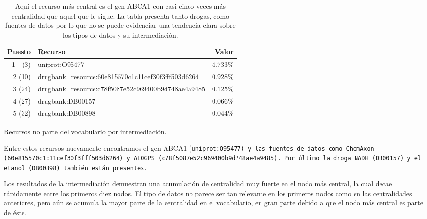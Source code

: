 \begin{table}[h]
  \centering
  \begin{tabular}{|r|l|r|}\hline
    \bf{Puesto} & \bf{Recurso} & \bf{Valor} \\\hline
    1~~(3) & uniprot:O95477                                      & $4.733\%$ \\\hline
    2 (10) & drugbank\_resource:60e815570c1c11cef30f3fff503d6264 & $0.928\%$ \\\hline
    3 (24) & drugbank\_resource:c78f5087e52c969400b9d748ae4a9485 & $0.125\%$ \\\hline
    4 (27) & drugbank:DB00157                                    & $0.066\%$ \\\hline
    5 (32) & drugbank:DB00898                                    & $0.044\%$ \\\hline
  \end{tabular}
  \caption{Recursos no parte del vocabulario por intermediación.}
  \label{tab:bet5}
  \vspace{-.2cm}
  \caption*{\small
    Aquí el recurso más central es el gen ABCA1 con casi cinco veces más
    centralidad que aquel que le sigue. La tabla presenta tanto drogas, como
    fuentes de datos por lo que no se puede evidenciar una tendencia clara sobre
    los tipos de datos y su intermediación.
  }
\end{table}

Entre estos recursos nuevamente encontramos el gen ABCA1 (\tt{uniprot:O95477})
y las fuentes de datos como ChemAxon (\tt{60e815570c1c11cef30f3fff503d6264}) y
ALOGPS (\tt{c78f5087e52c969400b9d748ae4a9485}). Por último la droga NADH
(\tt{DB00157}) y el etanol (\tt{DB00898}) también están presentes.

Los resultados de la intermediación demuestran una acumulación de centralidad
muy fuerte en el nodo más central, la cual decae rápidamente entre los primeros
diez nodos.
El tipo de datos no parece ser tan relevante en los primeros nodos como en las
centralidades anteriores, pero aún se acumula la mayor parte de la centralidad
en el vocabulario, en gran parte debido a que el nodo más central es parte de
éste.

